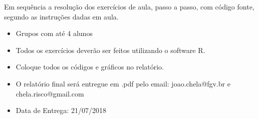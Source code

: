 \label{chap:Introdução} Em sequência a resolução dos exercícios de aula, passo a passo, com código fonte, segundo as instruções dadas em aula.

\begin{itemize}
\item{Grupos com até 4 alunos}
\item{Todos os exercícios deverão ser feitos utilizando o software R.}
\item{Coloque todos os códigos e gráficos  no relatório.}
\item{O relatório  final será entregue em .pdf pelo email: joao.chela@fgv.br e chela.risco@gmail.com}
\item{Data de Entrega: 21/07/2018}
\end{itemize}
